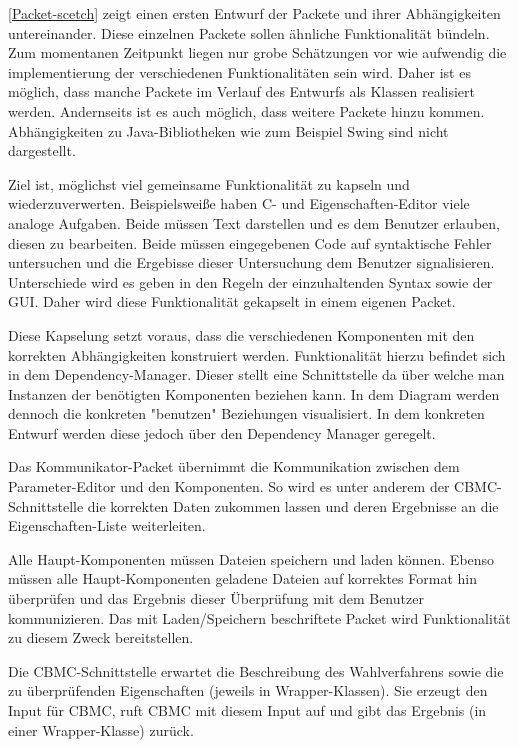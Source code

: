 \documentclass[a4paper]{scrreprt}
\begin{document}
\ref{Packet-scetch} zeigt einen ersten Entwurf der Packete und ihrer Abhängigkeiten untereinander. Diese einzelnen Packete sollen ähnliche Funktionalität bündeln. Zum momentanen Zeitpunkt liegen nur grobe Schätzungen vor wie aufwendig die implementierung der verschiedenen Funktionalitäten sein wird. Daher ist es möglich, dass manche Packete im Verlauf des Entwurfs als Klassen realisiert werden. Andernseits ist es auch möglich, dass weitere Packete hinzu kommen. Abhängigkeiten zu Java-Bibliotheken wie zum Beispiel Swing sind nicht dargestellt.

Ziel ist, möglichst  viel gemeinsame Funktionalität zu kapseln und wiederzuverwerten. Beispielsweiße haben C- und Eigenschaften-Editor viele analoge Aufgaben. Beide müssen Text darstellen und es dem Benutzer erlauben, diesen zu bearbeiten. Beide müssen eingegebenen Code auf syntaktische Fehler untersuchen und die Ergebisse dieser Untersuchung dem Benutzer signalisieren. Unterschiede wird es geben in den Regeln der einzuhaltenden Syntax sowie der \ac{GUI}. Daher wird diese Funktionalität gekapselt in einem eigenen Packet. 

Diese Kapselung setzt voraus, dass die verschiedenen Komponenten mit den korrekten Abhängigkeiten konstruiert werden. Funktionalität hierzu befindet sich in dem Dependency-Manager. Dieser stellt eine Schnittstelle da über welche man Instanzen der benötigten Komponenten beziehen kann. In dem Diagram werden dennoch die konkreten "benutzen" Beziehungen visualisiert. In dem konkreten Entwurf werden diese jedoch über den Dependency Manager geregelt. 

Das Kommunikator-Packet übernimmt die Kommunikation zwischen dem Parameter-Editor und den Komponenten. So wird es unter anderem der CBMC-Schnittstelle die korrekten Daten zukommen lassen und deren Ergebnisse an die Eigenschaften-Liste weiterleiten.

Alle Haupt-Komponenten müssen Dateien speichern und laden können. Ebenso müssen alle Haupt-Komponenten geladene Dateien auf korrektes Format hin überprüfen und das Ergebnis dieser Überprüfung mit dem Benutzer kommunizieren. Das mit Laden/Speichern beschriftete Packet wird Funktionalität zu diesem Zweck bereitstellen. 

Die CBMC-Schnittstelle erwartet die Beschreibung des Wahlverfahrens sowie die zu überprüfenden Eigenschaften (jeweils in Wrapper-Klassen). Sie erzeugt den Input für CBMC, ruft CBMC mit diesem Input auf und gibt das Ergebnis (in einer Wrapper-Klasse) zurück.
\end{document}
